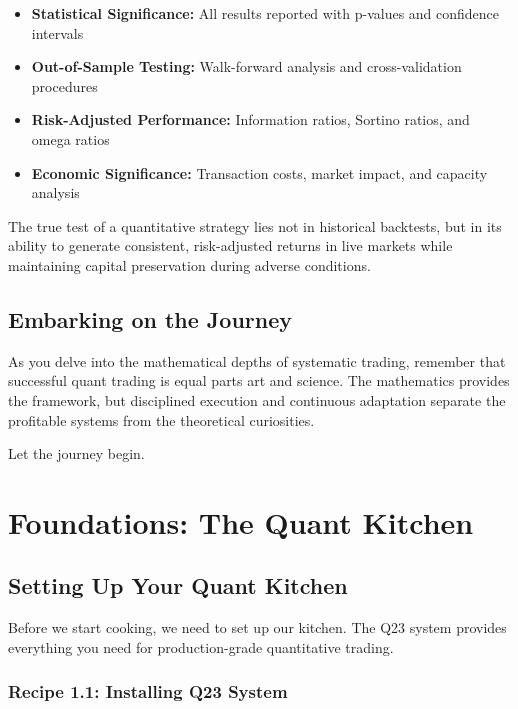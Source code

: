\documentclass[11pt,letterpaper,openany]{book}
\begin{document}
\begin{itemize}
    \item \textbf{Statistical Significance:} All results reported with p-values and confidence intervals
    \item \textbf{Out-of-Sample Testing:} Walk-forward analysis and cross-validation procedures
    \item \textbf{Risk-Adjusted Performance:} Information ratios, Sortino ratios, and omega ratios
    \item \textbf{Economic Significance:} Transaction costs, market impact, and capacity analysis
\end{itemize}

\begin{keyinsight}
The true test of a quantitative strategy lies not in historical backtests, but in its ability to generate consistent, risk-adjusted returns in live markets while maintaining capital preservation during adverse conditions.
\end{keyinsight}

\section*{Embarking on the Journey}

As you delve into the mathematical depths of systematic trading, remember that successful quant trading is equal parts art and science. The mathematics provides the framework, but disciplined execution and continuous adaptation separate the profitable systems from the theoretical curiosities.

Let the journey begin.

\chapter{Foundations: The Quant Kitchen}

\section{Setting Up Your Quant Kitchen}

Before we start cooking, we need to set up our kitchen. The Q23 system provides everything you need for production-grade quantitative trading.

\subsection{Recipe 1.1: Installing Q23 System}
\end{document}
